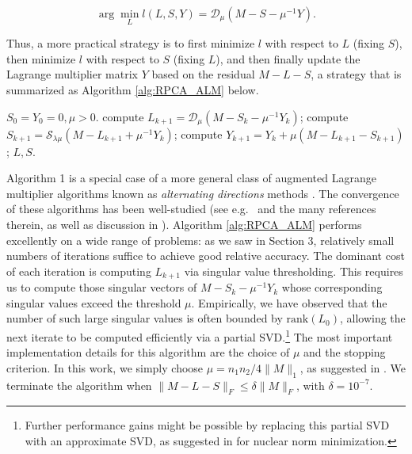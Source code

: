 \begin{equation}
\arg \min\limits_L l(L,S,Y) = \mathcal{D}_\mu( M-S-\mu^{-1} Y ).
\end{equation}

Thus, a more practical strategy is to first minimize $l$ with respect to $L$ (fixing $S$), then minimize $l$ with respect to $S$ (fixing $L$), and then finally update the Lagrange multiplier matrix $Y$ based on the residual $M-L-S$, a strategy that is summarized as Algorithm \ref{alg:RPCA_ALM} below.

\begin{algorithm}[th]
\caption{\bf (Principal Component Pursuit\, by Alternating Directions \cite{Lin2009-ALM,Yuan2009})}
\begin{algorithmic}[1]
 $S_0 = Y_0 = 0, \mu > 0$.
\STATE compute $L_{k+1} = \mathcal{D}_\mu( M-S_k-\mu^{-1} Y_k)$;
\STATE compute $S_{k+1} = \mathcal{S}_{\lambda \mu}(M-L_{k+1}+\mu^{-1} Y_k)$;
\STATE compute $Y_{k+1} = Y_k + \mu (M - L_{k+1} - S_{k+1})$;
\ENDWHILE
{} $L,S$.
\end{algorithmic}
\label{alg:RPCA_ALM}
\end{algorithm}

Algorithm 1 is a special case of a more general class of augmented Lagrange multiplier algorithms known as {\em alternating directions} methods \cite{Yuan2009}. The convergence of these algorithms has been well-studied (see e.g.\ \cite{Lions1979,Kontogiorgis1989} and the many references therein, as well as discussion in \cite{Lin2009-ALM,Yuan2009}). Algorithm \ref{alg:RPCA_ALM} performs excellently on a wide range of problems: as we saw in Section 3, relatively small numbers of iterations suffice to achieve good relative accuracy. The dominant cost of each iteration is computing $L_{k+1}$ via singular value thresholding. This requires us to compute those singular vectors of $M-S_k-\mu^{-1} Y_k$ whose corresponding singular values exceed the threshold $\mu$. Empirically, we have observed that the number of such large singular values is often bounded by $\mathrm{rank}(L_0)$,
allowing the next iterate to be computed efficiently via a partial
SVD.\footnote{Further performance gains might be possible by replacing this partial SVD with an approximate SVD, as suggested in \cite{Goldfarb2009} for nuclear norm minimization.} The most important implementation details for this algorithm are the choice of
$\mu$ and the stopping criterion. In this work, we simply choose $\mu
= n_1 n_2 / 4 \| M \|_1$, as suggested in \cite{Yuan2009}. We terminate the algorithm when $\| M - L - S \|_F \le \delta \| M \|_F$,
with $\delta = 10^{-7}$.

